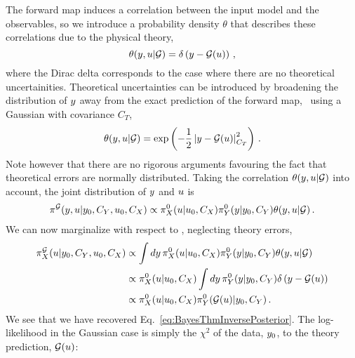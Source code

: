 The forward map induces a correlation between the input model and the
observables, so we introduce a probability density $\theta$ that describes these
correlations due to the physical theory,  
\begin{equation}
  \label{eq:ThetaCorr}
  \theta(y,u|\mathcal{G}) = \delta\left(y - \mathcal{G}(u)\right)\, ,
\end{equation}
where the Dirac delta corresponds to the case where there are no theoretical
uncertainities. Theoretical uncertainties can be introduced by broadening the
distribution of $y$ away from the exact prediction of the forward map, \eg\
using a Gaussian with covariance $C_T$,
\begin{equation}
  \label{eq:TheoryErrors}
  \theta(y,u|\mathcal{G}) = \exp\left(
    -\frac12 
    \left| y - \mathcal{G}(u)
    \right|_{C_T}^2\right)\, .
\end{equation}
Note however that there are no rigorous arguments favouring the fact that
theoretical errors are normally distributed. Taking the correlation
$\theta(y,u|\mathcal{G})$ into account, the joint distribution of
$y$ and $u$ is
\begin{align}
  \label{eq:JointYAndU}
  \pi^{\mathcal{G}}(y,u|y_0,C_{Y},u_0,C_X) 
  \propto 
  \pi_{X}^0(u|u_0, C_X) 
  \pi_{Y}^0(y|y_0,C_{Y}) 
  \theta(y,u|\mathcal{G})\, .
\end{align}
We can now marginalize with respect to \obs, neglecting theory errors, 
\begin{align}
  \label{eq:MarginOne}
  \pi^{\mathcal{G}}_{X}(u|y_0,C_{Y},u_0,C_X) 
  &\propto \int dy\, 
    \pi_{X}^0(u|u_0,C_X) 
    \pi_{Y}^0(y|y_0,C_{Y}) 
    \theta(y,u|\mathcal{G}) \\
  & \propto \pi_{X}^0(u|u_0,C_X)  
    \int dy\, 
    \pi_{Y}^0(y|y_0,C_{Y}) 
    \delta\left(y-\mathcal{G}(u)\right) \\
  & \propto 
    \pi_{X}^0(u|u_0,C_X) 
    \pi_{Y}^0(\mathcal{G}(u)|y_0,C_{Y})\, .
\end{align}
We see that we have recovered Eq.~\ref{eq:BayesThmInversePosterior}. The
log-likelihood in the Gaussian case is simply the $\chi^2$ of the data,
$y_0$, to the theory prediction, $\mathcal{G}(u)$:
